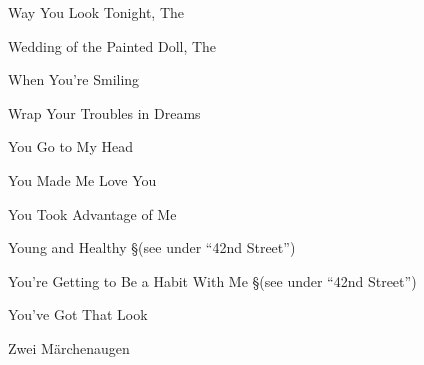 \N Way You Look Tonight, The

\N Wedding of the Painted Doll, The

\N When You're Smiling

\N Wrap Your Troubles in Dreams

\N You Go to My Head

\N You Made Me Love You

\N You Took Advantage of Me

\N Young and Healthy
\nobreak
\S (see under ``42nd Street'')

\N You're Getting to Be a Habit With Me
\nobreak
\S (see under ``42nd Street'')

\N You've Got That Look

\N Zwei M{\"a}rchenaugen

\singlecolumn


\bye
